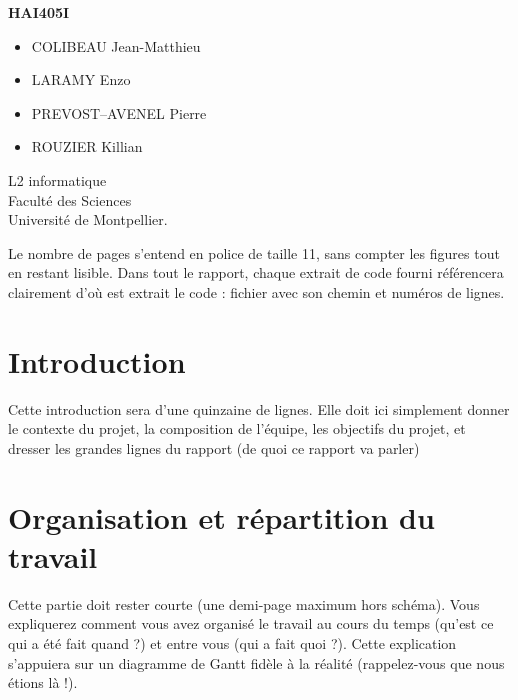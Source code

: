 \documentclass[a4paper]{article}
\begin{document}
\centerline{\Huge\bf HAI405I}
\vspace*{1.5cm}
\begin{center}               %
	

\end{center}
\vspace*{1.5cm}


\vspace*{1.5cm}


\begin{itemize}
\item COLIBEAU Jean-Matthieu
\item LARAMY Enzo
\item PREVOST--AVENEL Pierre
\item ROUZIER Killian
\end{itemize}
\vspace*{1.5cm}
\begin{center}
  L2 informatique\\
  Faculté des Sciences\\
Université de Montpellier.
\end{center}

\newpage
Le nombre de pages s'entend en police de taille 11, sans compter les figures tout en restant lisible.  Dans tout le rapport, chaque extrait de code fourni référencera clairement d’où est extrait le code : fichier avec son chemin et numéros de lignes. 

\section{Introduction}
Cette introduction sera d’une quinzaine de lignes. Elle doit ici simplement donner le contexte du projet, la composition de l’équipe, les objectifs du projet, et dresser les grandes lignes du rapport (de quoi ce rapport va parler)

\section{Organisation et répartition du travail}
 Cette partie doit rester courte (une demi-page maximum hors schéma). Vous expliquerez comment vous avez organisé le travail au cours du temps (qu’est ce qui a été fait quand ?) et entre vous (qui a fait quoi ?). Cette explication s’appuiera sur un diagramme de Gantt fidèle à la réalité (rappelez-vous que nous étions là !). 
\end{document}
